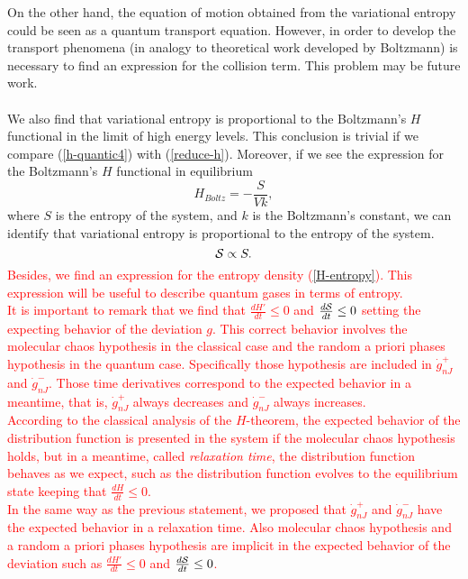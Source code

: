 On the other hand, the equation of motion obtained from the variational entropy could be seen as a quantum transport equation. However, in order to develop the transport phenomena (in analogy to theoretical work developed by Boltzmann) is necessary to find an expression for the collision term. This problem may be future work.\\
\\
We also find that variational entropy is proportional to the Boltzmann's $H$ functional in the limit of high energy levels. This conclusion is trivial if we compare (\ref{h-quantic4}) with (\ref{reduce-h}). Moreover, if we see the expression for the Boltzmann's $H$ functional in equilibrium
\begin{equation}
    H_{Boltz}=-\frac{S}{Vk},
\end{equation}
where $S$ is the entropy of the system, and $k$ is the Boltzmann's constant, we can identify that variational entropy is proportional to the entropy of the system.\\
\begin{equation}
    \mathcal{S}\propto S.
\end{equation}
\textcolor{red}{Besides, we find an expression for the entropy density (\ref{H-entropy}). This expression will be useful to describe quantum gases in terms of entropy.\\
It is important to remark that we find that $\frac{dH'}{dt}\leq 0$ and $\frac{d\mathcal{S}}{dt}\leq 0$ setting the expecting behavior of the deviation $g$. This correct behavior involves the molecular chaos hypothesis in the classical case and the random a priori phases hypothesis in the quantum case. Specifically those hypothesis are included in $\dot{g}_{nJ}^{+}$ and $\dot{g}_{nJ}^{-}$. Those time derivatives correspond to the expected behavior in a meantime, that is, $\dot{g}_{nJ}^{+}$ always decreases and $\dot{g}_{nJ}^{-}$ always increases.\\ 
According to the classical analysis of the $H$-theorem, the expected behavior of the distribution function is presented in the system if the molecular chaos hypothesis holds, but in a meantime, called \textit{relaxation time}, the distribution function behaves as we expect, such as the distribution function evolves to the equilibrium state keeping that $\frac{dH}{dt}\leq 0$.\\
In the same way as the previous statement, we proposed that $\dot{g}_{nJ}^{+}$ and $\dot{g}_{nJ}^{-}$ have the expected behavior in a relaxation time. Also molecular chaos hypothesis and a random a priori phases hypothesis are implicit in the expected behavior of the deviation such as $\frac{dH'}{dt}\leq 0$ and $\frac{d\mathcal{S}}{dt}\leq 0$.}


